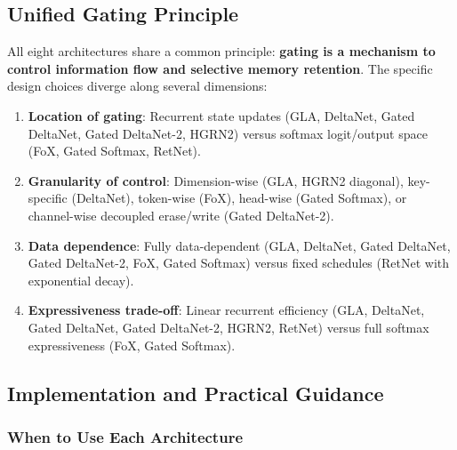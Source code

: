 \documentclass[11pt,a4paper]{article}
\begin{document}
\subsection{Unified Gating Principle}

All eight architectures share a common principle: \textbf{gating is a mechanism to control information flow and selective memory retention}. The specific design choices diverge along several dimensions:

\begin{enumerate}[leftmargin=*]
    \item \textbf{Location of gating}: Recurrent state updates (GLA, DeltaNet, Gated DeltaNet, Gated DeltaNet-2, HGRN2) versus softmax logit/output space (FoX, Gated Softmax, RetNet).
    \item \textbf{Granularity of control}: Dimension-wise (GLA, HGRN2 diagonal), key-specific (DeltaNet), token-wise (FoX), head-wise (Gated Softmax), or channel-wise decoupled erase/write (Gated DeltaNet-2).
    \item \textbf{Data dependence}: Fully data-dependent (GLA, DeltaNet, Gated DeltaNet, Gated DeltaNet-2, FoX, Gated Softmax) versus fixed schedules (RetNet with exponential decay).
    \item \textbf{Expressiveness trade-off}: Linear recurrent efficiency (GLA, DeltaNet, Gated DeltaNet, Gated DeltaNet-2, HGRN2, RetNet) versus full softmax expressiveness (FoX, Gated Softmax).
\end{enumerate}

\subsection{Implementation and Practical Guidance}

\subsubsection{When to Use Each Architecture}
\end{document}
